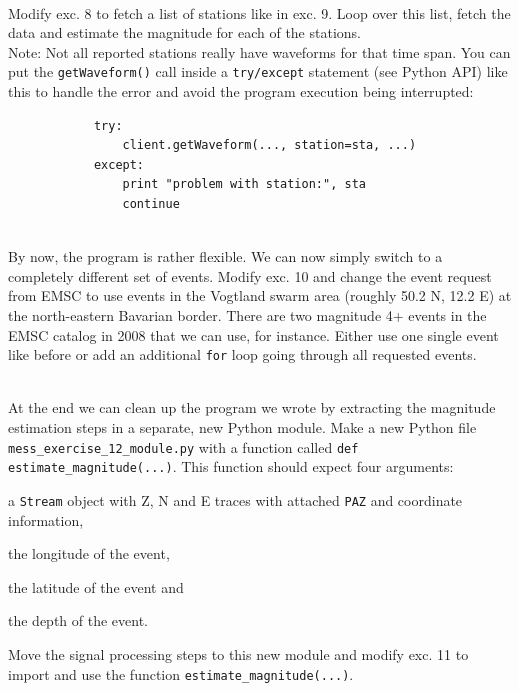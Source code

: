 \documentclass{LMUexercise}
\begin{document}
\\
Modify exc. 8 to fetch a list of stations like in exc. 9. Loop over this list,
fetch the data and estimate the magnitude for each of the stations.\\ Note: Not
all reported stations really have waveforms for that time span. You can put the
\verb#getWaveform()# call inside a \verb#try/except# statement (see Python API)
like this to handle the error and avoid the program execution being
interrupted:
{\footnotesize
\begin{verbatim}
            try:
                client.getWaveform(..., station=sta, ...)
            except:
                print "problem with station:", sta
                continue
\end{verbatim}
}
\vspace*{3.0em}

\\
By now, the program is rather flexible. We can now simply switch to a
completely different set of events. Modify exc. 10 and change the event request
from EMSC to use events in the Vogtland swarm area (roughly 50.2 N, 12.2 E) at
the north-eastern Bavarian border. There are two magnitude 4+ events in the
EMSC catalog in 2008 that we can use, for instance. Either use one single event
like before or add an additional \verb#for# loop going through all requested
events.
\vspace*{3.0em}

\\
At the end we can clean up the program we wrote by extracting the magnitude
estimation steps in a separate, new Python module. Make a new Python file
\verb#mess_exercise_12_module.py# with a function called
\verb#def estimate_magnitude(...)#. This function should expect four arguments:
\begin{inparaenum} \item a \verb#Stream# object with Z, N
and E traces with attached \verb#PAZ# and coordinate information, \item the
longitude of the event, \item the latitude of the event and \item the depth of
the event.  \end{inparaenum} Move the signal processing steps to this new
module and modify exc. 11 to import and use the function
\verb#estimate_magnitude(...)#.
\vspace*{3.0em}
\end{document}
